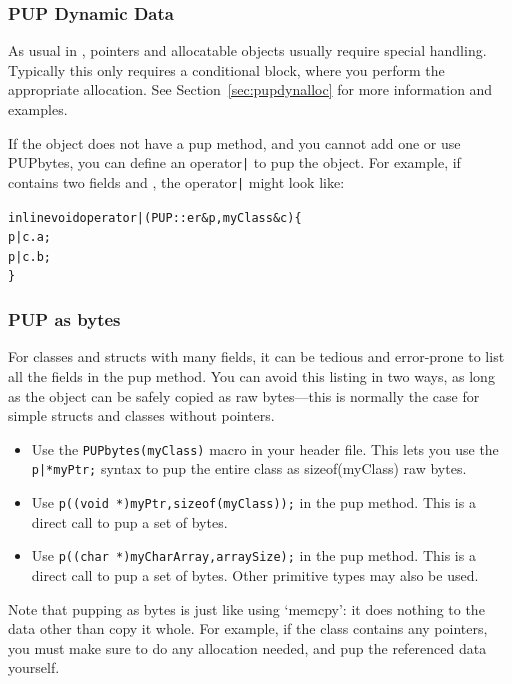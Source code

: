 \subsubsection{PUP Dynamic Data}
As usual in \CC{}, pointers and allocatable objects usually require special handling. 
Typically this only requires a  conditional block, 
where you perform the appropriate allocation.  See 
Section~\ref{sec:pupdynalloc} for more information and examples.  

If the object does not have a pup method, and you cannot add one or use 
PUPbytes, you can define an operator\verb.|. to pup the object.
For example, if  contains two fields  and , the 
operator\verb.|. might look like:

\begin{alltt}
  inline void operator|(PUP::er &p,myClass &c) \{
    p|c.a;
    p|c.b;
  \}
\end{alltt}


\subsubsection{PUP as bytes}

\label{sec:pupbytes}

For classes and structs with many fields, it can be tedious and 
error-prone to list all the fields in the pup method.
You can avoid this listing in two ways, as long as the
object can be safely copied as raw bytes---this is normally 
the case for simple structs and classes without pointers.

\begin{itemize}
\item Use the \verb.PUPbytes(myClass). macro in your header file.
      This lets you use the \verb.p|*myPtr;. syntax 
      to pup the entire class as sizeof(myClass) raw bytes.

\item Use \verb.p((void *)myPtr,sizeof(myClass));. in the pup 
      method.  This is a direct call to pup a set of bytes. 
      
\item Use \verb.p((char *)myCharArray,arraySize);. in the pup 
      method.  This is a direct call to pup a set of bytes. 
	  Other primitive types may also be used.
      
\end{itemize}

Note that pupping as bytes is just like using `memcpy': 
it does nothing to the data other than copy it whole.
For example, if the class contains any pointers, you
must make sure to do any allocation needed, and
pup the referenced data yourself.

